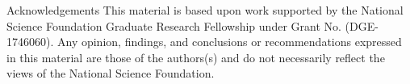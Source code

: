 \documentclass[final]{beamer} %
\begin{document}
\begin{frame}
\begin{columns}
\begin{column}{0.3\textwidth}
{        \vfill
        


        
        
        \begin{block}{\boxnumber Acknowledgements}
          \footnotesize{This material is based upon work supported by the National Science Foundation Graduate Research Fellowship under Grant No. (DGE-1746060). Any opinion, findings, and conclusions or recommendations expressed in this material are those of the authors(s) and do not necessarily reflect the views of the National Science Foundation.}
        \end{block}

        
        }%
    \end{column}
    
  \end{columns}
\end{frame}
\end{document}
